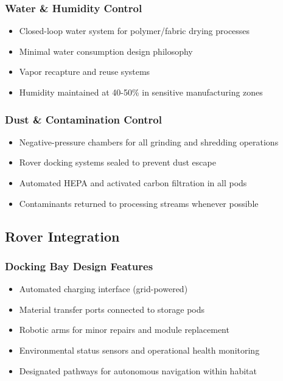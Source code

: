 \documentclass[12pt, a4paper]{article}
\begin{document}
\subsubsection{Water \& Humidity Control}
\begin{itemize}
    \item Closed-loop water system for polymer/fabric drying processes
    \item Minimal water consumption design philosophy
    \item Vapor recapture and reuse systems
    \item Humidity maintained at 40-50\% in sensitive manufacturing zones
\end{itemize}

\subsubsection{Dust \& Contamination Control}
\begin{itemize}
    \item Negative-pressure chambers for all grinding and shredding operations
    \item Rover docking systems sealed to prevent dust escape
    \item Automated HEPA and activated carbon filtration in all pods
    \item Contaminants returned to processing streams whenever possible
\end{itemize}

\subsection{Rover Integration}

\subsubsection{Docking Bay Design Features}
\begin{itemize}
    \item Automated charging interface (grid-powered)
    \item Material transfer ports connected to storage pods
    \item Robotic arms for minor repairs and module replacement
    \item Environmental status sensors and operational health monitoring
    \item Designated pathways for autonomous navigation within habitat
\end{itemize}
\end{document}

